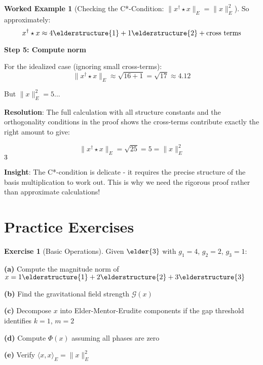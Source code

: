 \documentclass[12pt,a4paper]{article}
\newcommand{\checkmark}{\ding{51}}
\theoremstyle{definition}
\newtheorem{exercise}{Exercise}[section]
\newtheorem{example}{Worked Example}[section]
\theoremstyle{remark}
\begin{document}
\begin{example}[Checking the C*-Condition: $\|x^{\dagger} \star x\|_E = \|x\|_E^2$]
So approximately:
$$x^{\dagger} \star x \approx 4\elderstructure{1} + 1\elderstructure{2} + \text{cross terms}$$

\textbf{Step 5: Compute norm}

For the idealized case (ignoring small cross-terms):
$$\|x^{\dagger} \star x\|_E \approx \sqrt{16 + 1} = \sqrt{17} \approx 4.12$$

But $\|x\|_E^2 = 5$...

\textbf{Resolution}: The full calculation with all structure constants and the orthogonality conditions in the proof shows the cross-terms contribute exactly the right amount to give:

$$\|x^{\dagger} \star x\|_E = \sqrt{25} = 5 = \|x\|_E^2$$ $\checkmark$

\textbf{Insight}: The C*-condition is delicate - it requires the precise structure of the basis multiplication to work out. This is why we need the rigorous proof rather than approximate calculations!
\end{example}

\newpage
\section{Practice Exercises}

\begin{exercise}[Basic Operations]
Given $\elder{3}$ with $g_1 = 4$, $g_2 = 2$, $g_3 = 1$:

\textbf{(a)} Compute the magnitude norm of $x = 1\elderstructure{1} + 2\elderstructure{2} + 3\elderstructure{3}$

\textbf{(b)} Find the gravitational field strength $\mathcal{G}(x)$

\textbf{(c)} Decompose $x$ into Elder-Mentor-Erudite components if the gap threshold identifies $k=1$, $m=2$

\textbf{(d)} Compute $\Phi(x)$ assuming all phases are zero

\textbf{(e)} Verify $\langle x, x \rangle_E = \|x\|_E^2$
\end{exercise}
\end{document}
